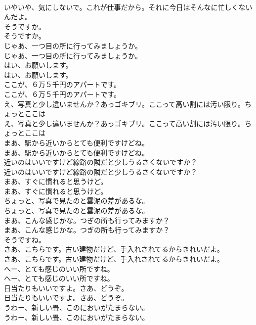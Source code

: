 \documentclass[8pt]{extreport}
\begin{document}
\begin{CJK}{UTF8}{min}
\\	いやいや、気にしないで。これが仕事だから。それに今日はそんなに忙しくないんだよ。 
\\	そうですか。	
\\	そうですか。 
\\	じゃあ、一つ目の所に行ってみましょうか。	
\\	じゃあ、一つ目の所に行ってみましょうか。 
\\	はい、お願いします。	
\\	はい、お願いします。 
\\	ここが、６万５千円のアパートです。	
\\	ここが、６万５千円のアパートです。 
\\	え、写真と少し違いませんか？あっゴキブリ。ここって高い割には汚い限り。ちょっとここは
\\	え、写真と少し違いませんか？あっゴキブリ。ここって高い割には汚い限り。ちょっとここは
\\	まあ、駅から近いからとても便利ですけどね。	
\\	まあ、駅から近いからとても便利ですけどね。 
\\	近いのはいいですけど線路の隣だと少しうるさくないですか？	
\\	近いのはいいですけど線路の隣だと少しうるさくないですか？ 
\\	まあ、すぐに慣れると思うけど。	
\\	まあ、すぐに慣れると思うけど。 
\\	ちょっと、写真で見たのと雲泥の差があるな。	
\\	ちょっと、写真で見たのと雲泥の差があるな。 
\\	まあ、こんな感じかな。つぎの所も行ってみますか？	
\\	まあ、こんな感じかな。つぎの所も行ってみますか？ 
\\	そうですね。 
\\	さあ、こちらです。古い建物だけど、手入れされてるからきれいだよ。	
\\	さあ、こちらです。古い建物だけど、手入れされてるからきれいだよ。 
\\	へー、とても感じのいい所ですね。	
\\	へー、とても感じのいい所ですね。 
\\	日当たりもいいですよ。さあ、どうぞ。	
\\	日当たりもいいですよ。さあ、どうぞ。 
\\	うわー、新しい畳、このにおいがたまらない。	
\\	うわー、新しい畳、このにおいがたまらない。 

\end{CJK}
\end{document}

